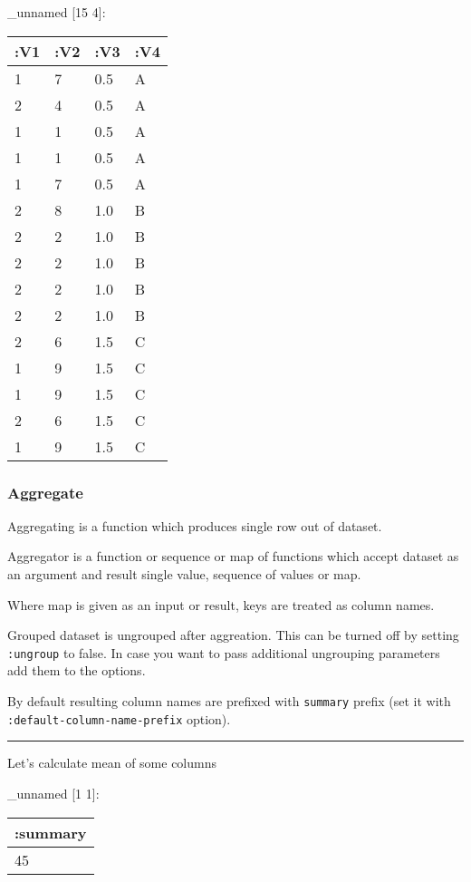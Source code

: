 \documentclass[]{article}
\newenvironment{Shaded}{\begin{snugshade}}{\end{snugshade}}
\newcommand{\AttributeTok}[1]{\textcolor[rgb]{0.77,0.63,0.00}{#1}}
\newcommand{\KeywordTok}[1]{\textcolor[rgb]{0.13,0.29,0.53}{\textbf{#1}}}
\newcommand{\NormalTok}[1]{#1}
\newcommand{\VariableTok}[1]{\textcolor[rgb]{0.00,0.00,0.00}{#1}}
\begin{document}
\_unnamed {[}15 4{]}:

\begin{longtable}[]{@{}llll@{}}
\toprule
:V1 & :V2 & :V3 & :V4\tabularnewline
\midrule
\endhead
1 & 7 & 0.5 & A\tabularnewline
2 & 4 & 0.5 & A\tabularnewline
1 & 1 & 0.5 & A\tabularnewline
1 & 1 & 0.5 & A\tabularnewline
1 & 7 & 0.5 & A\tabularnewline
2 & 8 & 1.0 & B\tabularnewline
2 & 2 & 1.0 & B\tabularnewline
2 & 2 & 1.0 & B\tabularnewline
2 & 2 & 1.0 & B\tabularnewline
2 & 2 & 1.0 & B\tabularnewline
2 & 6 & 1.5 & C\tabularnewline
1 & 9 & 1.5 & C\tabularnewline
1 & 9 & 1.5 & C\tabularnewline
2 & 6 & 1.5 & C\tabularnewline
1 & 9 & 1.5 & C\tabularnewline
\bottomrule
\end{longtable}

\hypertarget{aggregate}{%
\subsubsection{Aggregate}\label{aggregate}}

Aggregating is a function which produces single row out of dataset.

Aggregator is a function or sequence or map of functions which accept
dataset as an argument and result single value, sequence of values or
map.

Where map is given as an input or result, keys are treated as column
names.

Grouped dataset is ungrouped after aggreation. This can be turned off by
setting \texttt{:ungroup} to false. In case you want to pass additional
ungrouping parameters add them to the options.

By default resulting column names are prefixed with \texttt{summary}
prefix (set it with \texttt{:default-column-name-prefix} option).

\begin{center}\rule{0.5\linewidth}{0.5pt}\end{center}

Let's calculate mean of some columns

\begin{Shaded}
\end{Shaded}

\_unnamed {[}1 1{]}:

\begin{longtable}[]{@{}l@{}}
\toprule
:summary\tabularnewline
\midrule
\endhead
45\tabularnewline
\bottomrule
\end{longtable}
\end{document}
